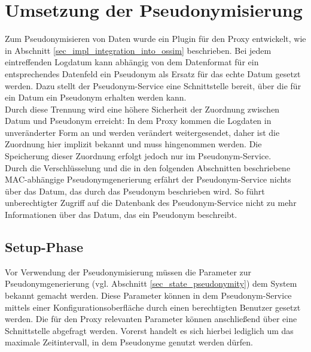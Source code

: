 \section{Umsetzung der Pseudonymisierung} %

\label{sec_impl_pseudonymity}





Zum Pseudonymisieren von Daten wurde ein Plugin für den Proxy entwickelt, wie in Abschnitt \ref{sec_impl_integration_into_ossim} beschrieben. Bei jedem eintreffenden Logdatum kann abhängig von dem Datenformat für ein entsprechendes Datenfeld ein Pseudonym als Ersatz für das echte Datum gesetzt werden. Dazu stellt der Pseudonym-Service eine Schnittstelle bereit, über die für ein Datum ein Pseudonym erhalten werden kann.\\
Durch diese Trennung wird eine höhere Sicherheit der Zuordnung zwischen Datum und Pseudonym erreicht: In dem Proxy kommen die Logdaten in unveränderter Form an und werden verändert weitergesendet, daher ist die Zuordnung hier implizit bekannt und muss hingenommen werden. Die Speicherung dieser Zuordnung erfolgt jedoch nur im Pseudonym-Service.\\
Durch die Verschlüsselung und die in den folgenden Abschnitten beschriebene MAC-abhängige Pseudonymgenerierung erfährt der Pseudonym-Service nichts über das Datum, das durch das Pseudonym beschrieben wird. So führt unberechtigter Zugriff auf die Datenbank des Pseudonym-Service nicht zu mehr Informationen über das Datum, das ein Pseudonym beschreibt.

\subsection{Setup-Phase}

Vor Verwendung der Pseudonymisierung müssen die Parameter zur Pseudonymgenerierung (vgl. Abschnitt \ref{sec_state_pseudonymity}) dem System bekannt gemacht werden. Diese Parameter können in dem Pseudonym-Service mittels einer Konfigurationsoberfläche durch einen berechtigten Benutzer gesetzt werden. Die für den Proxy relevanten Parameter können anschließend über eine Schnittstelle abgefragt werden. Vorerst handelt es sich hierbei lediglich um das maximale Zeitintervall, in dem Pseudonyme genutzt werden dürfen.


